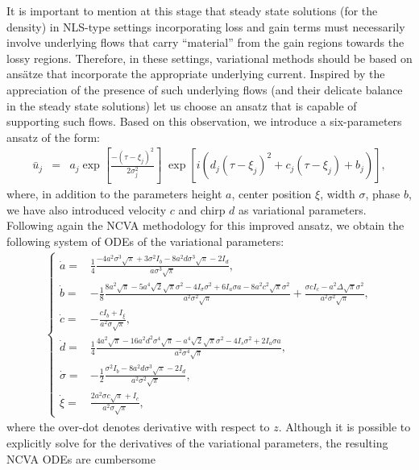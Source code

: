 It is important to mention at this stage that steady state solutions
(for the density) in NLS-type settings incorporating loss and gain
terms must necessarily involve underlying flows that carry
``material'' from the gain regions towards the lossy regions.
%
Therefore, in these settings, variational methods should be based
on ans\"atze that incorporate the appropriate underlying current.
%
Inspired by the appreciation of the presence of such underlying flows 
(and their delicate balance in the steady state solutions)
let us choose an ansatz that is capable of supporting such flows.
%
Based on this observation, we introduce a six-parameters ansatz
of the form:
%
\begin{eqnarray}
\bar{u}_j &=&  a_j \exp\left[\frac{-(\tau-\xi_j)^2}{2\sigma_j^2}\right] \;  \exp\left[i(d_j(\tau-\xi_j)^2 + c_j(\tau - \xi_j) + b_j)\right] ,
\label{6pansatz}
\end{eqnarray}
%
where, in addition to the parameters height $a$, center position $\xi$, 
width $\sigma$, phase $b$, we have also introduced  velocity $c$ and 
chirp $d$ as variational parameters.
%
Following again the NCVA methodology for this improved ansatz, we 
obtain the following system of ODEs of the variational parameters:
%
\begin{align}
\begin{cases}
\dot{a} =& \frac{1}{4}\frac{-4a^2\sigma^3\sqrt{\pi}+3\sigma^2I_b-8a^2d\sigma^3\sqrt{\pi}-2I_d}{a\sigma^3\sqrt{\pi}}, \\[1em]
\dot{b} =& -\frac{1}{8}\frac{8a^2\sqrt{\pi}-5a^4\sqrt{2}\sqrt{\pi}\sigma^2-4I_\sigma \sigma^2+6I_a\sigma a-8a^2c^2\sqrt{\pi}\sigma^2}{ a^2\sigma^2\sqrt{\pi}} + \frac{\sigma c I_c-a^2 \Delta\sqrt{\pi}\sigma^2}{a^2\sigma^2\sqrt{\pi}}, \\[1em]
\dot{c} =& -\frac{c I_b+I_{\xi}}{a^2\sigma\sqrt{\pi}}, \\[1em]
\dot{d} =& \frac{1}{4}\frac{4a^2\sqrt{\pi}-16a^2 d^2 \sigma^4\sqrt{\pi}-a^4\sqrt{2}\sqrt{\pi}\sigma^2-4I_s\sigma^2+2I_a\sigma a}
{a^2\sigma^4\sqrt{\pi}}, \\[1em]
\dot{\sigma} =& -\frac{1}{2}\frac{\sigma^2I_b-8a^2 d \sigma^3\sqrt{\pi}-2I_d}{a^2\sigma^2\sqrt{\pi}}, \\[1em]
\dot{\xi} =& \frac{2a^2\sigma c \sqrt{\pi}+I_c}{a^2\sigma\sqrt{\pi}}, 
\end{cases}
\label{6pE}
\end{align}
%
where the over-dot denotes derivative with respect to $z$.  Although it is possible to explicitly solve for the derivatives
of the variational parameters, the resulting NCVA ODEs are cumbersome
